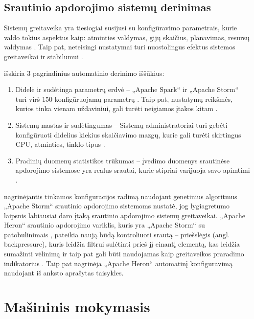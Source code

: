\documentclass{VUMIFPSbakalaurinis}
\begin{document}
\subsection{Srautinio apdorojimo sistemų derinimas}
Sistemų greitaveika yra tiesiogiai susijusi su konfigūravimo parametrais, kurie valdo tokius aspektus kaip: atminties valdymas, gijų skaičius, planavimas, resursų valdymas \cite{lu2019speedup}. Taip pat, neteisingi nustatymai turi nuostolingus efektus sistemos greitaveikai ir stabilumui \cite{herodotou2011starfish}. 

\cite{herodotou2020survey} išskiria 3 pagrindinius automatinio derinimo iššūkius:
\begin{enumerate}
    \item Didelė ir sudėtinga parametrų erdvė – „Apache Spark“ ir „Apache Storm“ turi virš 150 konfigūruojamų parametrų \cite{Bilal2017Towards, petridis2016spark}. Taip pat, nustatymų reikšmės, kurios tinka vienam uždaviniui, gali turėti neigiamos įtakos kitam \cite{herodotou2011starfish, Pooyan2016Uncertainty}.
    \item Sistemų mastas ir sudėtingumas – Sistemų administratoriai turi gebėti konfigūruoti didelius kiekius skaičiavimo mazgų, kurie gali turėti skirtingus CPU, atminties, tinklo tipus \cite{herodotou2020survey}.
    \item Pradinių duomenų statistikos trūkumas – įvedimo duomenys srautinėse apdorojimo sistemose yra realus srautai, kurie stipriai varijuoja savo apimtimi \cite{Dayarathna2018Recent}.
\end{enumerate}  

\cite{Trotter2017Into} nagrinėjantis tinkamos konfigūracijos radimą naudojant genetinius algoritmus „Apache Storm“ srautinio apdorojimo sistemoms nustatė, jog lygiagretumo laipsnis labiausiai daro įtaką srautinio apdorojimo sistemų greitaveikai. „Apache Heron“ srautinio apdorojimo variklis, kuris yra „Apache Storm“ su patobulinimais \cite{twitterHeron}, pateikia naują būdą kontroliuoti srautą – priešslėgis (angl. backpressure), kuris leidžia filtrui sulėtinti prieš jį einantį elementą, kas leidžia sumažinti vėlinimą ir taip pat gali būti naudojamas kaip greitaveikos praradimo indikatorius \cite{bansal2018trevor}.
Taip pat \cite{bansal2018trevor} nagrinėja „Apache Heron“ automatinį konfigūravimą naudojant iš anksto aprašytas taisykles. 

\section{Mašininis mokymasis}
\end{document}

